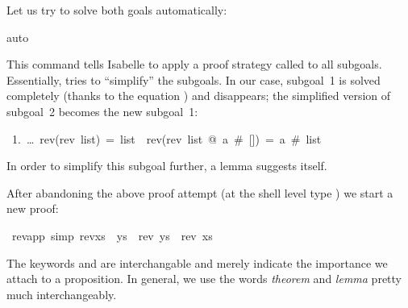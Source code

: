 \begin{isabellebody}
\begin{isamarkuptxt}
Let us try to solve both goals automatically:%
\end{isamarkuptxt}%
auto{\isacharparenright}%
\begin{isamarkuptxt}%
\noindent
This command tells Isabelle to apply a proof strategy called
 to all subgoals. Essentially,  tries to
``simplify'' the subgoals.  In our case, subgoal~1 is solved completely (thanks
to the equation ) and disappears; the simplified version
of subgoal~2 becomes the new subgoal~1:
\begin{isabelle}
~1.~\dots~rev(rev~list)~=~list~{\isasymLongrightarrow}~rev(rev~list~@~a~\#~[])~=~a~\#~list
\end{isabelle}
In order to simplify this subgoal further, a lemma suggests itself.%
\end{isamarkuptxt}%
%
%
\begin{isamarkuptext}%
After abandoning the above proof attempt (at the shell level type
) we start a new proof:%
\end{isamarkuptext}%
\ rev{\isacharunderscore}app\ {\isacharbrackleft}simp{\isacharbrackright}{\isacharcolon}\ {\isachardoublequote}rev{\isacharparenleft}xs\ {\isacharat}\ ys{\isacharparenright}\ {\isacharequal}\ {\isacharparenleft}rev\ ys{\isacharparenright}\ {\isacharat}\ {\isacharparenleft}rev\ xs{\isacharparenright}{\isachardoublequote}%
\begin{isamarkuptxt}%
\noindent The keywords  and
 are interchangable and merely indicate
the importance we attach to a proposition. In general, we use the words
\emph{theorem} and \emph{lemma} pretty much
interchangeably.


\end{isamarkuptxt}
\end{isabellebody}
